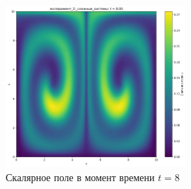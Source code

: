 \begin{figure}[h]
	\centering
	\includegraphics[width=0.6\textwidth]{imgs/эксперимент_3:_сложные_системы_t8.00.png}
	\caption{Скалярное поле в момент времени $t=8$}
\end{figure}
